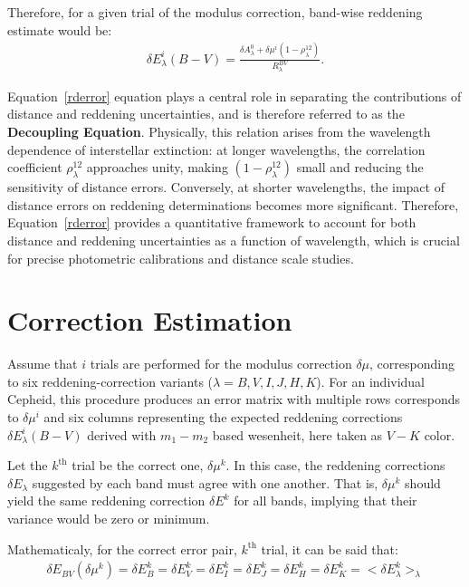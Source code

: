 Therefore, for a given trial of the modulus correction, band-wise reddening estimate would be:
\begin{align}
	\label{rderror}
\delta E_\lambda^i(B-V) = \frac{\delta A_\lambda^0 + \delta \mu^i (1 - \rho_\lambda^{12})}{R_\lambda^{BV}}.
\end{align}

Equation~\ref{rderror} equation plays a central role in separating the contributions of distance and reddening uncertainties, and is therefore referred to as the \textbf{Decoupling Equation}. Physically, this relation arises from the wavelength dependence of interstellar extinction: at longer wavelengths, the correlation coefficient $\rho_\lambda^{12}$ approaches unity, making $(1 - \rho_\lambda^{12})$ small and reducing the sensitivity of distance errors. Conversely, at shorter wavelengths, the impact of distance errors on reddening determinations becomes more significant. Therefore, Equation~\ref{rderror} provides a quantitative framework to account for both distance and reddening uncertainties as a function of wavelength, which is crucial for precise photometric calibrations and distance scale studies.

\section{Correction Estimation}

Assume that $i$ trials are performed for the modulus correction $\delta\mu$, corresponding to six reddening-correction variants ($\lambda = B, V, I, J, H, K$). For an individual Cepheid, this procedure produces an error matrix with multiple rows corresponds to $\delta\mu^i$ and six columns representing the expected reddening corrections $\delta E_\lambda^i(B-V)$ derived with $m_1 - m_2$ based wesenheit, here taken as $V-K$ color.



Let the $k^{\mathrm{th}}$ trial be the correct one, $\delta \mu^k$. In this case, the reddening corrections $\delta E_\lambda$ suggested by each band must agree with one another. That is, $\delta\mu^k$ should yield the same reddening correction $\delta E^k$ for all bands, implying that their variance would be zero or minimum.

Mathematicaly, for the correct error pair, $k^{\mathrm{th}}$ trial, it can be said that:
\begin{align}
	\delta E_{BV}(\delta \mu^k) = \delta E^k_B = \delta E^k_V = \delta E^k_I = \delta E^k_J = \delta E^k_H = \delta E^k_K = <\delta E^k_\lambda>_\lambda
\end{align}

